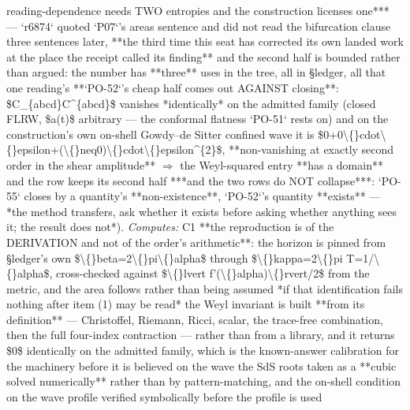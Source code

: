 \begin{description}
reading-dependence needs TWO entropies and the construction licenses one*** --- `r6874` quoted `P07`'s areas sentence and did not read the bifurcation clause three sentences later, **the third time this seat has corrected its own landed work at the place the receipt called its finding**  and the second half is bounded rather than argued: the number has **three** uses in the tree, all in \S{}ledger, all that one reading's   **`PO-52`'s cheap half comes out AGAINST closing**: \$C\_\{abcd\}C\textasciicircum{}\{abcd\}\$ vanishes *identically* on the admitted family (closed FLRW, \$a(t)\$ arbitrary --- the conformal flatness `PO-51` rests on) and on the construction's own on-shell Gowdy--de Sitter confined wave it is \$0+0\textbackslash\{\}cdot\textbackslash\{\}epsilon+(\textbackslash\{\}neq0)\textbackslash\{\}cdot\textbackslash\{\}epsilon\textasciicircum{}\{2\}\$, **non-vanishing at exactly second order in the shear amplitude** \ensuremath{\Rightarrow} the Weyl-squared entry **has a domain** and the row keeps its second half   ***and the two rows do NOT collapse***: `PO-55` closes by a quantity's **non-existence**, `PO-52`'s quantity **exists** --- *the method transfers, ask whether it exists before asking whether anything sees it; the result does not*). 
\emph{Computes:} C1 **the reproduction is of the DERIVATION and not of the order's arithmetic**: the horizon is pinned from \S{}ledger's own \$\textbackslash\{\}beta=2\textbackslash\{\}pi\textbackslash\{\}alpha\$ through \$\textbackslash\{\}kappa=2\textbackslash\{\}pi T=1/\textbackslash\{\}alpha\$, cross-checked against \$\textbackslash\{\}lvert f'(\textbackslash\{\}alpha)\textbackslash\{\}rvert/2\$ from the metric, and the area follows rather than being assumed  *if that identification fails nothing after item (1) may be read*  the Weyl invariant is built **from its definition** --- Christoffel, Riemann, Ricci, scalar, the trace-free combination, then the full four-index contraction --- rather than from a library, and it returns \$0\$ identically on the admitted family, which is the known-answer calibration for the machinery before it is believed on the wave  the SdS roots taken as a **cubic solved numerically** rather than by pattern-matching, and the on-shell condition on the wave profile verified symbolically before the profile is used

\end{description}

